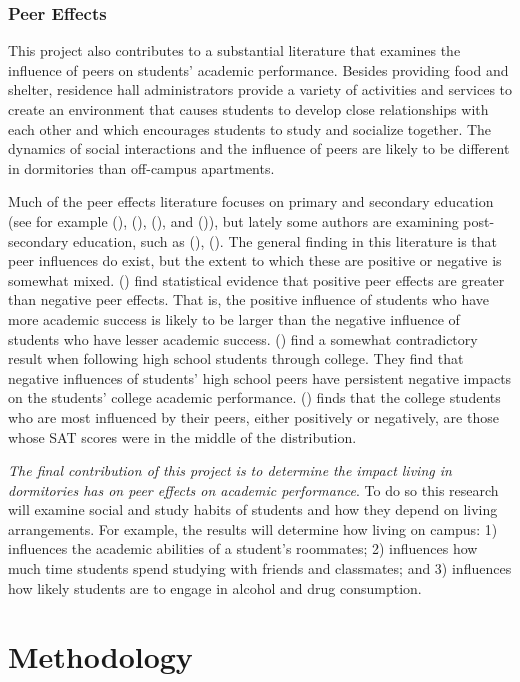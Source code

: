 \documentclass[11pt]{article}
\newcommand{\citee}[1]{\citename{#1} (\citeyear{#1})}
\begin{document}
\subsubsection{Peer Effects}
This project also contributes to a substantial literature that examines the influence of peers on students' academic performance.  Besides providing food and shelter, residence hall administrators provide a variety of activities and services to create an environment that causes students to develop close relationships with each other and which encourages students to study and socialize together.  The dynamics of social interactions and the influence of peers are likely to be different in dormitories than off-campus apartments.  

Much of the peer effects literature focuses on primary and secondary education (see for example \citee{coleman1966}, \citee{hms1978}, \citee{er1998}, and \citee{hanushek2003}), but lately some authors are examining post-secondary education, such as \citee{ts2001}, \citee{zimmerman2003}.  The general finding in this literature is that peer influences do exist, but the extent to which these are positive or negative is somewhat mixed.  \citee{hms1978} find statistical evidence that positive peer effects are greater than negative peer effects.  That is, the positive influence of students who have more academic success is likely to be larger than the negative influence of students who have lesser academic success.  \citee{bettsmorrell1999} find a somewhat contradictory result when following high school students through college.  They find that negative influences of students' high school peers have persistent negative impacts on the students' college academic performance.  \citee{zimmerman2003} finds that the college students who are most influenced by their peers, either positively or negatively, are those whose SAT scores were in the middle of the distribution.  

\textit{The final contribution of this project is to determine the impact living in dormitories has on peer effects on academic performance}.  To do so this research will examine social and study habits of students and how they depend on living arrangements.  For example, the results will determine how living on campus: 1) influences the academic abilities of a student's roommates; 2) influences how much time students spend studying with friends and classmates; and 3) influences how likely students are to engage in alcohol and drug consumption.

\section{Methodology}
\end{document}
